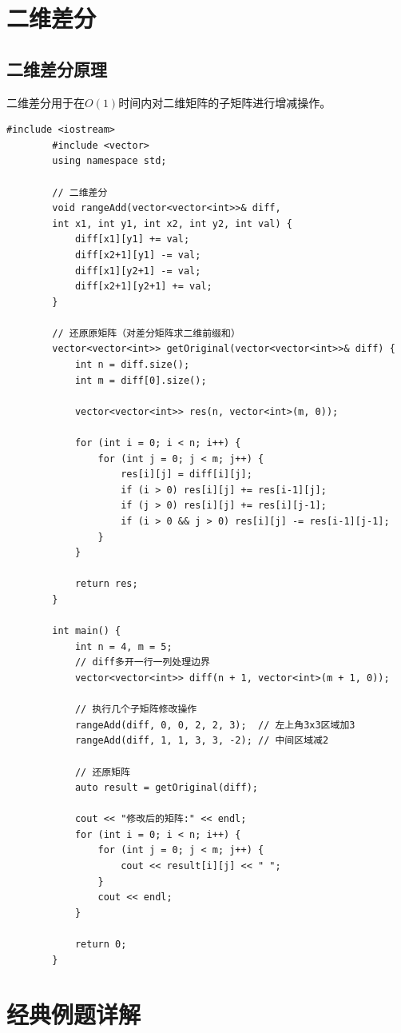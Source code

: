 \documentclass[12pt,a4paper]{article}
\begin{document}
	\section{二维差分}
	
	\subsection{二维差分原理}
	
	二维差分用于在$O(1)$时间内对二维矩阵的子矩阵进行增减操作。
	
	\begin{lstlisting}[caption={二维差分 - 完整模板}]
		#include <iostream>
		#include <vector>
		using namespace std;
		
		// 二维差分
		void rangeAdd(vector<vector<int>>& diff, 
		int x1, int y1, int x2, int y2, int val) {
			diff[x1][y1] += val;
			diff[x2+1][y1] -= val;
			diff[x1][y2+1] -= val;
			diff[x2+1][y2+1] += val;
		}
		
		// 还原原矩阵（对差分矩阵求二维前缀和）
		vector<vector<int>> getOriginal(vector<vector<int>>& diff) {
			int n = diff.size();
			int m = diff[0].size();
			
			vector<vector<int>> res(n, vector<int>(m, 0));
			
			for (int i = 0; i < n; i++) {
				for (int j = 0; j < m; j++) {
					res[i][j] = diff[i][j];
					if (i > 0) res[i][j] += res[i-1][j];
					if (j > 0) res[i][j] += res[i][j-1];
					if (i > 0 && j > 0) res[i][j] -= res[i-1][j-1];
				}
			}
			
			return res;
		}
		
		int main() {
			int n = 4, m = 5;
			// diff多开一行一列处理边界
			vector<vector<int>> diff(n + 1, vector<int>(m + 1, 0));
			
			// 执行几个子矩阵修改操作
			rangeAdd(diff, 0, 0, 2, 2, 3);  // 左上角3x3区域加3
			rangeAdd(diff, 1, 1, 3, 3, -2); // 中间区域减2
			
			// 还原矩阵
			auto result = getOriginal(diff);
			
			cout << "修改后的矩阵:" << endl;
			for (int i = 0; i < n; i++) {
				for (int j = 0; j < m; j++) {
					cout << result[i][j] << " ";
				}
				cout << endl;
			}
			
			return 0;
		}
	\end{lstlisting}
	
	\section{经典例题详解}
	
\end{document}
